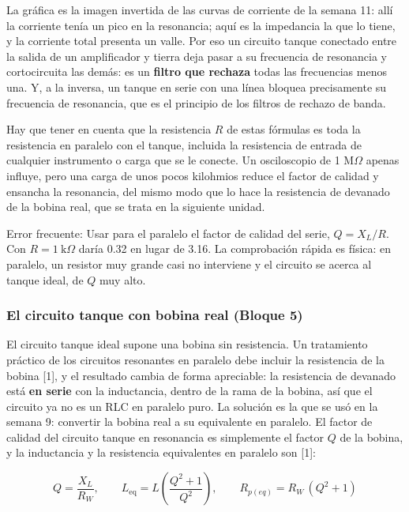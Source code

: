 \documentclass[11pt,letterpaper]{article}
\begin{document}
La gráfica es la imagen invertida de las curvas de corriente de la semana 11: allí la corriente tenía un pico en la resonancia; aquí es la impedancia la que lo tiene, y la corriente total presenta un valle. Por eso un circuito tanque conectado entre la salida de un amplificador y tierra deja pasar a su frecuencia de resonancia y cortocircuita las demás: es un \textbf{filtro que rechaza} todas las frecuencias menos una. Y, a la inversa, un tanque en serie con una línea bloquea precisamente su frecuencia de resonancia, que es el principio de los filtros de rechazo de banda.

Hay que tener en cuenta que la resistencia $R$ de estas fórmulas es toda la resistencia en paralelo con el tanque, incluida la resistencia de entrada de cualquier instrumento o carga que se le conecte. Un osciloscopio de 1 M\ensuremath{\Omega} apenas influye, pero una carga de unos pocos kilohmios reduce el factor de calidad y ensancha la resonancia, del mismo modo que lo hace la resistencia de devanado de la bobina real, que se trata en la siguiente unidad.

\begin{nota}{Error frecuente:}
Usar para el paralelo el factor de calidad del serie, $Q = X_L/R$. Con $R = 1\ \text{k}\Omega$ daría 0.32 en lugar de 3.16. La comprobación rápida es física: en paralelo, un resistor muy grande casi no interviene y el circuito se acerca al tanque ideal, de $Q$ muy alto.
\end{nota}

\subsubsection{El circuito tanque con bobina real (Bloque 5)}

El circuito tanque ideal supone una bobina sin resistencia. Un tratamiento práctico de los circuitos resonantes en paralelo debe incluir la resistencia de la bobina [1], y el resultado cambia de forma apreciable: la resistencia de devanado está \textbf{en serie} con la inductancia, dentro de la rama de la bobina, así que el circuito ya no es un RLC en paralelo puro. La solución es la que se usó en la semana 9: convertir la bobina real a su equivalente en paralelo. El factor de calidad del circuito tanque en resonancia es simplemente el factor $Q$ de la bobina, y la inductancia y la resistencia equivalentes en paralelo son [1]:

\begin{equation}
  Q = \frac{X_L}{R_W}, \qquad L_{\mathrm{eq}} = L\left(\frac{Q^{2} + 1}{Q^{2}}\right), \qquad R_{p(eq)} = R_W\,(Q^{2} + 1)
\end{equation}
\end{document}
